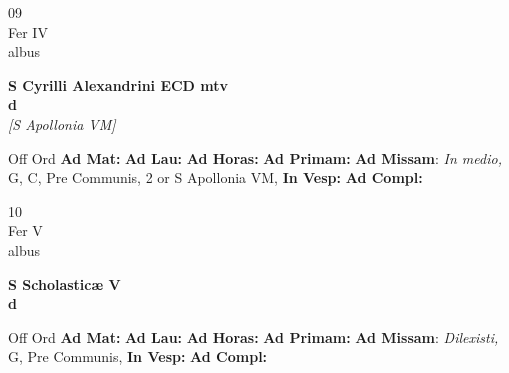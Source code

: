 \documentclass[10pt, openany]{book}
\begin{document}
        \begin{center}
            \begin{minipage}{3.5in}
                \vspace{2em}
                \begin{minipage}{0.5in}
                    {\Huge 09} \\
                    {\normalsize Fer IV} \\
                    {\normalsize albus}
                \end{minipage}
                \begin{minipage}{3.0in}
                    \textbf{ \large S Cyrilli Alexandrini ECD mtv \\
                    \textnormal{\normalsize d}} \\ \textit{[S Apollonia VM]} \\ 
                \end{minipage}
                \begin{justify}Off Ord
                    \textbf{Ad Mat: }
                    \textbf{Ad Lau: }
                    \textbf{Ad Horas: }
                    \textbf{Ad Primam: }\textbf{Ad Missam}: \textit{In medio,} G, C, Pre Communis, 2 or S Apollonia VM,  
                    \textbf{In Vesp: }
                    \textbf{Ad Compl: }
                \end{justify}
            \end{minipage}
        \end{center}
    
        \begin{center}
            \begin{minipage}{3.5in}
                \vspace{2em}
                \begin{minipage}{0.5in}
                    {\Huge 10} \\
                    {\normalsize Fer V} \\
                    {\normalsize albus}
                \end{minipage}
                \begin{minipage}{3.0in}
                    \textbf{ \large S Scholasticæ V \\
                    \textnormal{\normalsize d}} \\ 
                \end{minipage}
                \begin{justify}Off Ord
                    \textbf{Ad Mat: }
                    \textbf{Ad Lau: }
                    \textbf{Ad Horas: }
                    \textbf{Ad Primam: }\textbf{Ad Missam}: \textit{Dilexisti,} G, Pre Communis,  
                    \textbf{In Vesp: }
                    \textbf{Ad Compl: }
                \end{justify}
            \end{minipage}
        \end{center}
    
\end{document}
